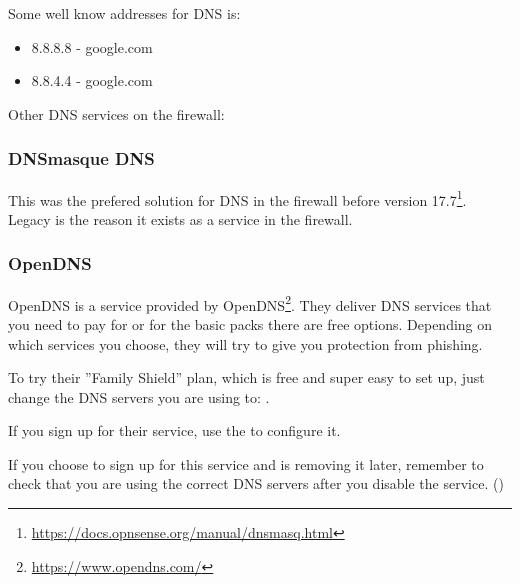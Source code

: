 Some well know addresses for DNS is:
\begin{itemize}
    \item 8.8.8.8 - google.com
    \item 8.8.4.4 - google.com
\end{itemize}


Other DNS services on the firewall:

\subsubsection*{DNSmasque DNS}
This was the prefered solution for DNS in the firewall before version 17.7\footnote{\url{https://docs.opnsense.org/manual/dnsmasq.html}}. Legacy is the reason it exists as a service in the firewall.

\subsubsection*{OpenDNS}
OpenDNS is a service provided by OpenDNS\footnote{\url{https://www.opendns.com/}}. They deliver DNS services that you need to pay for or for the basic packs there are free options. Depending on which services you choose, they will try to give you protection from phishing. 

To try their ''Family Shield'' plan, which is free and super easy to set up, just change the DNS servers you are using to: . 

If you sign up for their service, use the  to configure it.


\begin{importantblock}
    If you choose to sign up for this service and is removing it later, remember to check that you are using the correct DNS servers after you disable the service. ()
\end{importantblock}

